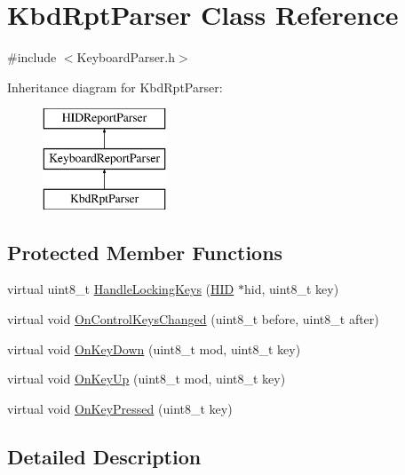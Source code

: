 \hypertarget{class_kbd_rpt_parser}{\section{\-Kbd\-Rpt\-Parser \-Class \-Reference}
\label{class_kbd_rpt_parser}
}


{\ttfamily \#include $<$\-Keyboard\-Parser.\-h$>$}

\-Inheritance diagram for \-Kbd\-Rpt\-Parser\-:\begin{figure}[H]
\begin{center}
\leavevmode
\includegraphics[height=3.000000cm]{class_kbd_rpt_parser}
\end{center}
\end{figure}
\subsection*{\-Protected \-Member \-Functions}
\begin{DoxyCompactItemize}
\item 
virtual uint8\-\_\-t \hyperlink{class_kbd_rpt_parser_aa0e7ab4e28e1a177208965f9de2cbe4f}{\-Handle\-Locking\-Keys} (\hyperlink{class_h_i_d}{\-H\-I\-D} $\ast$hid, uint8\-\_\-t key)
\item 
virtual void \hyperlink{class_kbd_rpt_parser_a84d8baeb9b6652a6ffa97ce8e6fe6f37}{\-On\-Control\-Keys\-Changed} (uint8\-\_\-t before, uint8\-\_\-t after)
\item 
virtual void \hyperlink{class_kbd_rpt_parser_ae97856b3d7d87d7b6e5778690c0de7b8}{\-On\-Key\-Down} (uint8\-\_\-t mod, uint8\-\_\-t key)
\item 
virtual void \hyperlink{class_kbd_rpt_parser_a93a93ad2c95d01e50943c28ea430f111}{\-On\-Key\-Up} (uint8\-\_\-t mod, uint8\-\_\-t key)
\item 
virtual void \hyperlink{class_kbd_rpt_parser_a0470635364b5ad643590281cfdc56beb}{\-On\-Key\-Pressed} (uint8\-\_\-t key)
\end{DoxyCompactItemize}


\subsection{\-Detailed \-Description}


